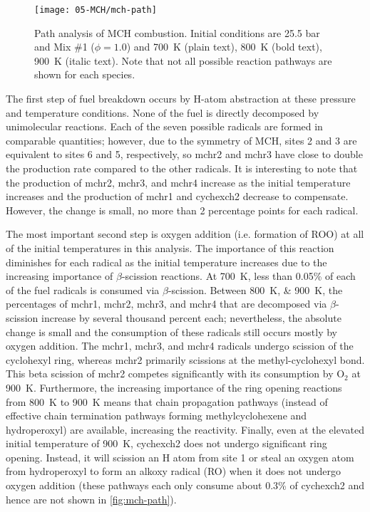 \documentclass[12pt, letterpaper]{article}
\begin{document}
\begin{figure}
    \texttt{[image: 05-MCH/mch-path]}
    \caption{Path analysis of MCH combustion. Initial conditions are 25.5 bar
    and Mix \#1 ($\phi=\num{1.0}$) and \SI{700}{\kelvin} (plain text),
    \SI{800}{\kelvin} (bold text), \SI{900}{\kelvin} (italic text).
    Note that not all possible reaction pathways are shown for
    each species.}
    \label{fig:mch-path}
\end{figure}

The first step of fuel breakdown occurs by H-atom abstraction at these pressure
and temperature conditions. None of the fuel is directly decomposed by
unimolecular reactions. Each of the seven possible radicals are formed in
comparable quantities; however, due to the symmetry of MCH, sites 2 and 3 are
equivalent to sites 6 and 5, respectively, so mchr2 and mchr3 have close to
double the production rate compared to the other radicals. It is interesting to
note that the production of mchr2, mchr3, and mchr4 increase as the initial
temperature increases and the production of mchr1 and cychexch2 decrease to
compensate. However, the change is small, no more than 2 percentage points for
each radical.

The most important second step is oxygen addition (i.e. formation of ROO) at
all of the initial temperatures in this analysis. The importance of this
reaction diminishes for each radical as the initial temperature increases due
to the increasing importance of $\beta$-scission reactions. At \SI{700}{\kelvin}, less than
0.05\% of each of the fuel radicals is consumed via $\beta$-scission. Between
\SIlist{800;900}{\kelvin}, the percentages of mchr1, mchr2, mchr3, and mchr4 that are decomposed
via $\beta$-scission increase by several thousand percent each; nevertheless,
the absolute change is small and the consumption of these radicals still occurs
mostly by oxygen addition. The mchr1, mchr3, and mchr4 radicals undergo
scission of the cyclohexyl ring, whereas mchr2 primarily scissions at the
methyl-cyclohexyl bond. This beta scission of mchr2 competes significantly with
its consumption by O$_2$ at \SI{900}{\kelvin}. Furthermore, the increasing importance of the
ring opening reactions from \SI{800}{\kelvin} to \SI{900}{\kelvin} means that chain propagation pathways
(instead of effective chain termination pathways forming methylcyclohexene and
hydroperoxyl) are available, increasing the reactivity. Finally, even at the
elevated initial temperature of \SI{900}{\kelvin}, cychexch2 does not undergo significant
ring opening. Instead, it will scission an H atom from site 1 or steal an oxygen
atom from hydroperoxyl to form an alkoxy radical (RO) when it does not undergo
oxygen addition (these pathways each only consume about 0.3\% of cychexch2 and
hence are not shown in \autoref{fig:mch-path}).
\end{document}
